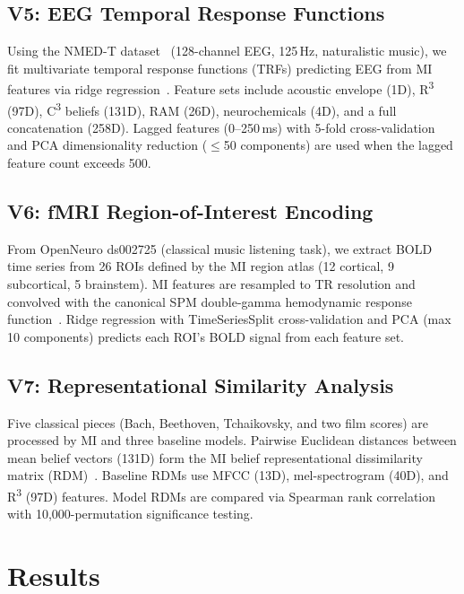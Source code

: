 \documentclass[twocolumn,10pt]{article}
\newcommand{\rthree}{R\textsuperscript{3}}
\newcommand{\cthree}{C\textsuperscript{3}}
\begin{document}
\subsection{V5: EEG Temporal Response Functions}

Using the NMED-T dataset~\citep{kaneshiro2020} (128-channel EEG, 125\,Hz, naturalistic music), we fit multivariate temporal response functions (TRFs) predicting EEG from MI features via ridge regression~\citep{hoerl1970, crosse2016}. Feature sets include acoustic envelope (1D), \rthree{} (97D), \cthree{} beliefs (131D), RAM (26D), neurochemicals (4D), and a full concatenation (258D). Lagged features (0--250\,ms) with 5-fold cross-validation and PCA dimensionality reduction ($\leq$50 components) are used when the lagged feature count exceeds 500.

\subsection{V6: fMRI Region-of-Interest Encoding}

From OpenNeuro ds002725 (classical music listening task), we extract BOLD time series from 26 ROIs defined by the MI region atlas (12 cortical, 9 subcortical, 5 brainstem). MI features are resampled to TR resolution and convolved with the canonical SPM double-gamma hemodynamic response function~\citep{glover1999}. Ridge regression with TimeSeriesSplit cross-validation and PCA (max 10 components) predicts each ROI's BOLD signal from each feature set.

\subsection{V7: Representational Similarity Analysis}

Five classical pieces (Bach, Beethoven, Tchaikovsky, and two film scores) are processed by MI and three baseline models. Pairwise Euclidean distances between mean belief vectors (131D) form the MI belief representational dissimilarity matrix (RDM)~\citep{kriegeskorte2008, nili2014}. Baseline RDMs use MFCC (13D), mel-spectrogram (40D), and \rthree{} (97D) features. Model RDMs are compared via Spearman rank correlation with 10,000-permutation significance testing.

\section{Results}
\label{sec:results}
\end{document}
